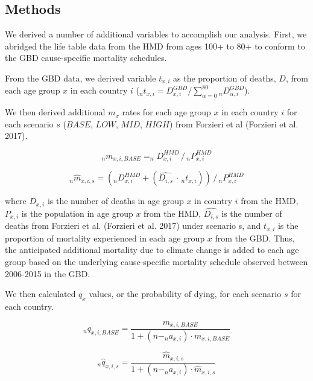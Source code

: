 \documentclass[12pt,]{article}
\begin{document}
\hypertarget{methods}{%
\subsection{Methods}\label{methods}}

We derived a number of additional variables to accomplish our analysis.
First, we abridged the life table data from the HMD from ages 100+ to
80+ to conform to the GBD cause-specific mortality schedules.

From the GBD data, we derived variable \(t_{x,i}\) as the proportion of
deaths, \(D\), from each age group \(x\) in each country \(i\)
(\(_nt_{x,i}=D_{x,i}^{GBD}/\sum_{\alpha=0}^{80}{_nD_{\alpha,i}^{GBD}}\)).

We then derived additional \(m_x\) rates for each age group \(x\) in
each country \(i\) for each scenario \(s\) (\(BASE\), \(LOW\), \(MID\),
\(HIGH\)) from Forzieri et al (Forzieri et al. 2017).

\begin{equation}
_nm_{x,i,BASE} = _nD_{x,i}^{HMD} \,/\, _nP_{x,i}^{HMD}
\end{equation}

\begin{equation}
_n\hat{m}_{x,i,s} = (_nD_{x,i}^{HMD} + (\hat{D_{i,s}} \,\cdot\, _nt_{x,i}) ) \,/\, _nP_{x,i}^{HMD}
\end{equation}

where \(D_{x,i}\) is the number of deaths in age group \(x\) in country
\(i\) from the HMD, \(P_{x,i}\) is the population in age group \(x\)
from the HMD, \(\hat{D_{i,s}}\) is the number of deaths from Forzieri et
al. (Forzieri et al. 2017) under scenario s, and \(t_{x,i}\) is the
proportion of mortality experienced in each age group \(x\) from the
GBD. Thus, the anticipated additional mortality due to climate change is
added to each age group based on the underlying cause-specific mortality
schedule observed between 2006-2015 in the GBD.

We then calculated \(q_x\) values, or the probability of dying, for each
scenario \(s\) for each country.

\begin{equation}
_nq_{x,i,BASE} = \frac{m_{x,i,BASE}}{1+(n-_na_{x,i}) \cdot m_{x,i,BASE}}
\end{equation}

\begin{equation}
_n\hat{q}_{x,i,s} = \frac{\hat{m}_{x,i,s}}{1+(n-_na_{x,i}) \cdot \hat{m}_{x,i,s}}
\end{equation}
\end{document}
